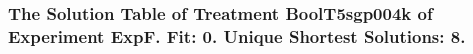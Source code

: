  \begin{frame}
 \fontsize{8pt}{9pt}\selectfont
 \frametitle{ The Solution Table of Treatment BoolT5sgp004k of Experiment ExpF. Fit: 0. Unique Shortest Solutions: 8. }

 \label{ExpFSolutionTable002.tex}  
 \end{frame}

